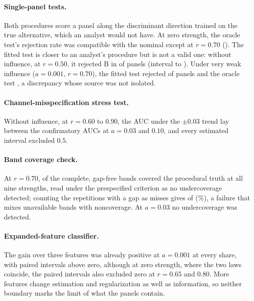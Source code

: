 \paragraph{Single-panel tests.} Both procedures score a panel along the discriminant direction trained on the true alternative, which an analyst would not have. At zero strength, the oracle test's rejection rate was compatible with the nominal  except at $r=0.70$ (). The fitted test is closer to an analyst's procedure but is not a valid one: without influence, at $r=0.50$, it rejected B in  of panels (interval  to ). Under very weak influence ($a=0.001$, $r=0.70$), the fitted test rejected  of panels and the oracle test , a discrepancy whose source was not isolated.

\paragraph{Channel-misspecification stress test.} Without influence, at $r=0.60$ to $0.90$, the AUC under the $\pm0.03$ trend lay between the confirmatory AUCs at $a=0.03$ and $0.10$, and every estimated interval excluded $0.5$.

\paragraph{Band coverage check.} At $r=0.70$,  of the  complete, gap-free bands covered the procedural truth at all nine strengths, read under the prespecified criterion as no undercoverage detected; counting the  repetitions with a gap as misses gives  of  (\%), a failure that mixes unavailable bands with noncoverage. At $a=0.03$ no undercoverage was detected.

\paragraph{Expanded-feature classifier.} The gain over three features was already positive at $a=0.001$ at every share, with paired intervals above zero, although at zero strength, where the two laws coincide, the paired intervals also excluded zero at $r=0.65$ and $0.80$. More features change estimation and regularization as well as information, so neither boundary marks the limit of what the panels contain.
